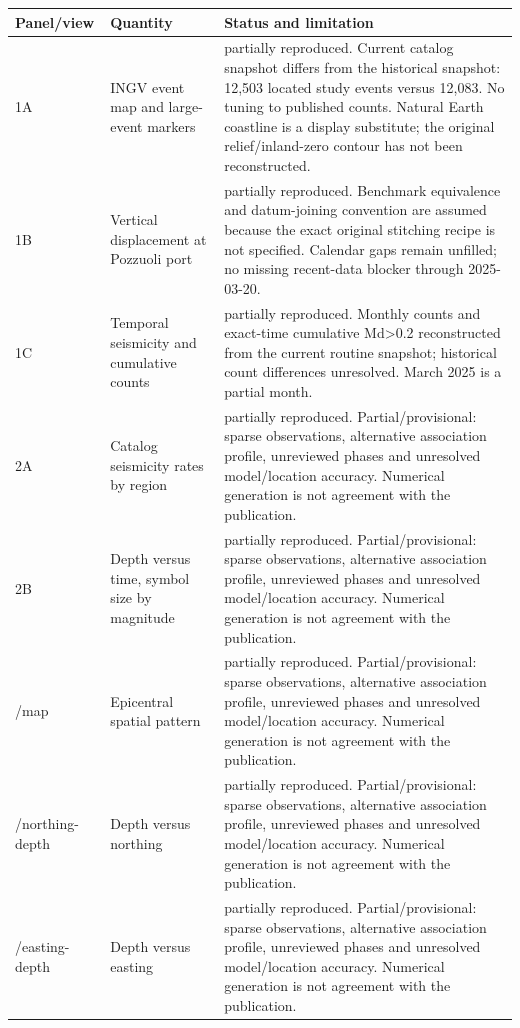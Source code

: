 \begin{longtable}{>{\raggedright\arraybackslash}p{.13\linewidth}>{\raggedright\arraybackslash}p{.28\linewidth}>{\raggedright\arraybackslash}p{.49\linewidth}}
\toprule Panel/view & Quantity & Status and limitation\\\midrule\endhead
1A & INGV event map and large-event markers & partially reproduced. Current catalog snapshot differs from the historical snapshot: 12,503 located study events versus 12,083. No tuning to published counts. Natural Earth coastline is a display substitute; the original relief/inland-zero contour has not been reconstructed.\\[3pt]
1B & Vertical displacement at Pozzuoli port & partially reproduced. Benchmark equivalence and datum-joining convention are assumed because the exact original stitching recipe is not specified. Calendar gaps remain unfilled; no missing recent-data blocker through 2025-03-20.\\[3pt]
1C & Temporal seismicity and cumulative counts & partially reproduced. Monthly counts and exact-time cumulative Md>0.2 reconstructed from the current routine snapshot; historical count differences unresolved. March 2025 is a partial month.\\[3pt]
2A & Catalog seismicity rates by region & partially reproduced. Partial/provisional: sparse observations, alternative association profile, unreviewed phases and unresolved model/location accuracy. Numerical generation is not agreement with the publication.\\[3pt]
2B & Depth versus time, symbol size by magnitude & partially reproduced. Partial/provisional: sparse observations, alternative association profile, unreviewed phases and unresolved model/location accuracy. Numerical generation is not agreement with the publication.\\[3pt]
3/\allowbreak{}map & Epicentral spatial pattern & partially reproduced. Partial/provisional: sparse observations, alternative association profile, unreviewed phases and unresolved model/location accuracy. Numerical generation is not agreement with the publication.\\[3pt]
3/\allowbreak{}northing-depth & Depth versus northing & partially reproduced. Partial/provisional: sparse observations, alternative association profile, unreviewed phases and unresolved model/location accuracy. Numerical generation is not agreement with the publication.\\[3pt]
3/\allowbreak{}easting-depth & Depth versus easting & partially reproduced. Partial/provisional: sparse observations, alternative association profile, unreviewed phases and unresolved model/location accuracy. Numerical generation is not agreement with the publication.\\[3pt]

\end{longtable}
